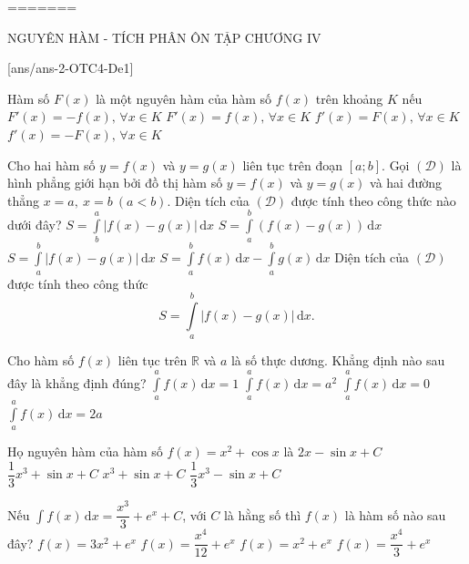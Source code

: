 =======
\begin{name}
	{NGUYÊN HÀM - TÍCH PHÂN}
	{ÔN TẬP CHƯƠNG IV}
	{\tentruong}
	{\thoigian}
\end{name}
\setcounter{ex}{0}\setcounter{bt}{0}
[ans/ans-2-OTC4-De1]
\caulc
\begin{ex}%
	Hàm số $F(x)$ là một nguyên hàm của hàm số $f(x)$ trên khoảng $K$ nếu
	\choice
	{$F'(x)=-f(x),\,\forall x \in K$}
	{\True $F'(x)=f(x),\,\forall x \in K$}
	{$f'(x)=F(x),\,\forall x \in K$}
	{$f'(x)=-F(x),\,\forall x \in K$}
\end{ex}
\begin{ex}%
	Cho hai hàm số $y=f(x)$ và $y=g(x)$ liên tục trên đoạn $[a;b]$. Gọi $(\mathscr{D})$ là hình phẳng giới hạn bởi đồ thị hàm số $y=f(x)$ và $y=g(x)$ và hai đường thẳng $x=a,~x=b~(a<b)$. Diện tích của $(\mathscr{D})$ được tính theo công thức nào dưới đây?
	\choice
	{$S=\displaystyle\int\limits_b^a \left| f(x)-g(x)\right|\mathrm{\,d}x$}
	{$S=\displaystyle\int\limits_a^b \left(f(x)-g(x)\right)\mathrm{\,d}x$}
	{\True $S=\displaystyle\int\limits_a^b \left| f(x)-g(x)\right|\mathrm{\,d}x$}
	{$S=\displaystyle\int\limits_a^b f(x)\mathrm{\,d}x-\displaystyle\int\limits_a^b g(x)\mathrm{\,d}x$}
	\loigiai
	{
	Diện tích của $(\mathscr{D})$ được tính theo công thức
	\[S=\displaystyle\int\limits_a^b \left| f(x)-g(x)\right|\mathrm{\,d}x.\]
	}
\end{ex}
\begin{ex}%
	Cho hàm số $f(x)$ liên tục trên $\mathbb{R}$ và $a$ là số thực dương. Khẳng định nào sau đây là khẳng định đúng?
	\choice
	{$\displaystyle\int\limits_a^a f(x) \mathrm{\,d}x=1$}
	{$\displaystyle\int\limits_a^af(x) \mathrm{\,d}x=a^2$}
	{\True $\displaystyle\int\limits_a^af(x) \mathrm{\,d}x=0$}
	{$\displaystyle\int\limits_a^a f(x) \mathrm{\,d}x=2a$}
\end{ex}
\begin{ex}%
	Họ nguyên hàm của hàm số $f(x) = x^2+\cos x$ là
	\choice
	{$2x-\sin x+C$}
	{\True $\dfrac{1}{3}x^3+\sin x+C$}
	{$x^3+\sin x+C$}
	{$\dfrac{1}{3}x^3-\sin x+C$}
\end{ex}
\begin{ex}%
	Nếu $\displaystyle\int f(x) \mathrm{\,d}x=\dfrac{x^3}{3}+e^x+C$, với $C$ là hằng số thì $ f(x) $ là hàm số nào sau đây?
	\choice
	{$f(x)=3x^2+e^x$}
	{$f(x)=\dfrac{x^4}{12}+e^x$}
	{\True $f(x)=x^2+e^x$}
	{$f(x)=\dfrac{x^4}{3}+e^x$}
\end{ex}
